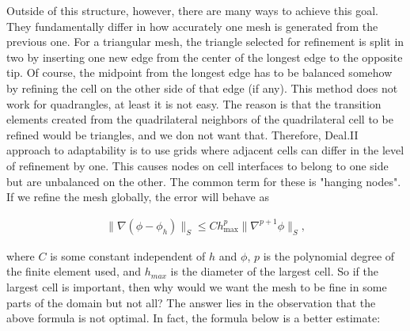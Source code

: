 \documentclass[]{pracamgr}
\begin{document}
        Outside of this structure, however, there are many ways to achieve this goal. They fundamentally differ in how accurately one mesh is generated from the previous one. For a triangular mesh, the triangle selected for refinement is split in two by inserting one new edge from the center of the longest edge to the opposite tip. Of course, the midpoint from the longest edge has to be balanced somehow by refining the cell on the other side of that edge (if any). This method does not work for quadrangles, at least it is not easy. The reason is that the transition elements created from the quadrilateral neighbors of the quadrilateral cell to be refined would be triangles, and we don not want that. Therefore, Deal.II approach to adaptability is to use grids where adjacent cells can differ in the level of refinement by one. This causes nodes on cell interfaces to belong to one side but are unbalanced on the other. The common term for these is "hanging nodes". If we refine the mesh globally, the error will behave as

        \begin{align*}
          \|\nabla(\phi-\phi_h)\|_{S} \le C h_\text{max}^p \| \nabla^{p+1} \phi \|_{S},
        \end{align*}

        where $C$ is some constant independent of $h$ and $\phi$, $p$ is the polynomial degree of the finite element used, and $h_{max}$ is the diameter of the largest cell. So if the largest cell is important, then why would we want the mesh to be fine in some parts of the domain but not all? The answer lies in the observation that the above formula is not optimal. In fact, the formula below is a better estimate:
        
\end{document}
